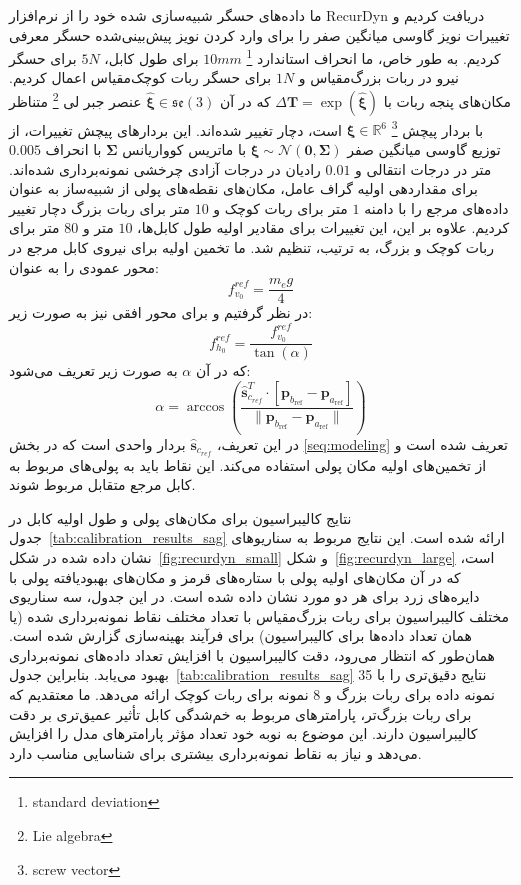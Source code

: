 ما داده‌های حسگر شبیه‌سازی شده خود را از نرم‌افزار RecurDyn دریافت کردیم و تغییرات نویز گاوسی میانگین صفر را برای وارد کردن نویز پیش‌بینی‌شده حسگر معرفی کردیم. به طور خاص، ما انحراف استاندارد
\footnote{standard deviation} 
$10mm$ 
برای طول کابل، $5N$ برای حسگر نیرو در ربات بزرگ‌مقیاس و $1N$ برای حسگر ربات کوچک‌مقیاس اعمال کردیم. مکان‌های پنجه ربات با $\Delta \mathbf{T} = \exp(\hat{\boldsymbol{\xi}})$ که در آن $\hat{\boldsymbol{\xi}} \in \mathfrak{se}(3)$ عنصر جبر لی
\footnote{Lie algebra}
 متناظر با بردار پیچش
\footnote{screw vector}
  $\boldsymbol{\xi} \in \mathbb{R}^6$
 است، دچار تغییر شده‌اند. این بردارهای پیچش تغییرات، از توزیع گاوسی میانگین صفر $\boldsymbol{\xi}\sim\mathcal{N}(\mathbf{0}, \boldsymbol{\Sigma})$ با ماتریس کوواریانس $\boldsymbol{\Sigma}$ با انحراف $0.005$ متر در درجات انتقالی و $0.01$ رادیان در درجات آزادی چرخشی نمونه‌برداری شده‌اند.
برای مقداردهی اولیه گراف عامل، مکان‌های نقطه‌های پولی از شبیه‌ساز به عنوان داده‌های مرجع را با دامنه $1$ متر برای ربات کوچک و $10$ متر برای  ربات بزرگ دچار تغییر کردیم. علاوه بر این، این تغییرات برای مقادیر اولیه طول کابل‌ها، $10$ متر و $80$ متر برای ربات کوچک و بزرگ، به ترتیب، تنظیم شد. ما تخمین اولیه برای نیروی کابل مرجع در محور عمودی را به عنوان:
\begin{equation}  \label{eq:fv_0}
	f^{{ref}}_{v_0} = \frac{m_eg}{4}
\end{equation}
  در نظر گرفتیم و برای محور افقی نیز به صورت زیر:
\begin{equation}  \label{eq:fh_0}
	f^{ref}_{h_0}=\frac{f^{{ref}}_{v_0}}{\tan(\alpha)} 
\end{equation}
که در آن $\alpha$ به صورت زیر تعریف می‌شود:
\begin{equation}  \label{eq:alpha}
	\alpha = \arccos\left(\frac{\hat{\bm{s}}_{c_{ref}}^T \cdot [\bm{p}_{b_{\text{ref}}} - \bm{p}_{a_{\text{ref}}}]}{\| \bm{p}_{b_{\text{ref}}} - \bm{p}_{a_{\text{ref}}} \|}\right)
\end{equation}
در این تعریف، $\hat{\bm{s}}_{c_{ref}}$ بردار واحدی است که در بخش \ref{seq:modeling} تعریف شده است و از تخمین‌های اولیه مکان پولی استفاده می‌کند. این نقاط باید به پولی‌های مربوط به کابل مرجع متقابل مربوط ‌شوند.

نتایج کالیبراسیون برای مکان‌های پولی و طول اولیه کابل در جدول~\ref{tab:calibration_results_sag} ارائه شده است. این نتایج مربوط به سناریوهای نشان داده شده در شکل~\ref{fig:recurdyn_small} و شکل~\ref{fig:recurdyn_large} است، که در آن مکان‌های اولیه پولی با ستاره‌های قرمز و مکان‌های بهبودیافته پولی‌ با دایره‌های زرد برای هر دو مورد نشان داده شده است.
در این جدول، سه سناریوی مختلف کالیبراسیون برای ربات بزرگ‌مقیاس با تعداد مختلف نقاط نمونه‌برداری شده (یا همان تعداد داده‌ها برای کالیبراسیون) برای فرآیند بهینه‌سازی گزارش شده است. همان‌طور که انتظار می‌رود، دقت کالیبراسیون با افزایش تعداد داده‌های نمونه‌برداری بهبود می‌یابد. بنابراین جدول~\ref{tab:calibration_results_sag} نتایج دقیق‌تری را با 35 نمونه داده برای ربات بزرگ و 8 نمونه برای ربات کوچک ارائه می‌دهد. ما معتقدیم که برای ربات بزرگ‌تر، پارامترهای مربوط به خم‌شدگی کابل تأثیر عمیق‌تری بر دقت کالیبراسیون دارند. این موضوع به نوبه خود تعداد مؤثر پارامترهای مدل را افزایش می‌دهد و نیاز به نقاط نمونه‌برداری بیشتری برای شناسایی مناسب دارد.


